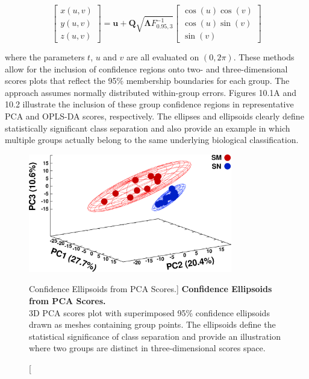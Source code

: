 \begin{equation}
\begin{bmatrix}
x(u,v) \\
y(u,v) \\
z(u,v)
\end{bmatrix}
 = \mathbf{u} + \mathbf{Q} \sqrt{\mathbf{\Lambda} F_{0.95,3}^{-1}}
\begin{bmatrix}
\cos(u) \cos(v) \\
\cos(u) \sin(v) \\
\sin(v)
\end{bmatrix}
\end{equation}

\begin{doublespace}
where the parameters $t$, $u$ and $v$ are all evaluated on $(0,2\pi)$. These
methods allow for the inclusion of confidence regions onto two- and
three-dimensional scores plots that reflect the 95\% membership boundaries
for each group. The approach assumes normally distributed within-group errors.
Figures 10.1A and 10.2 illustrate the inclusion of these group confidence
regions in representative PCA and OPLS-DA scores, respectively. The ellipses
and ellipsoids clearly define statistically significant class separation and
also provide an example in which multiple groups actually belong to the same
underlying biological classification.
\end{doublespace}

\begin{figure}
\includegraphics[width=3.5in]{figs/utils/02-pca.png}
\caption
      [Confidence Ellipsoids from PCA Scores.]{
  {\bf Confidence Ellipsoids from PCA Scores.}
  \\
  3D PCA scores plot with superimposed 95\% confidence ellipsoids drawn as
  meshes containing group points. The ellipsoids define the statistical
  significance of class separation and provide an illustration where two
  groups are distinct in three-dimensional scores space.
}
\end{figure}

